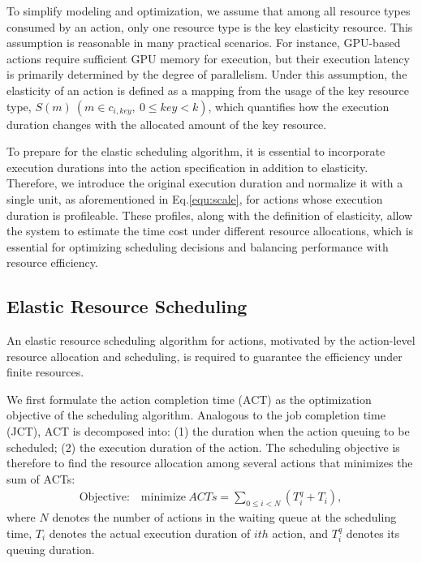 To simplify modeling and optimization, we assume that among all resource types consumed by an action, only one resource type is the key elasticity resource. 
This assumption is reasonable in many practical scenarios.
For instance, GPU-based actions require sufficient GPU memory for execution, but their execution latency is primarily determined by the degree of parallelism.
Under this assumption, the elasticity of an action is defined as a mapping from the usage of the key resource type, $S(m)~( m \in c_{i, key},~0\le key < k)$, which quantifies how the execution duration changes with the allocated amount of the key resource.

To prepare for the elastic scheduling algorithm, it is essential to incorporate execution durations into the action specification in addition to elasticity.
Therefore, we introduce the original execution duration and normalize it with a single unit, as aforementioned in Eq.\ref{equ:scale}, for actions whose execution duration is profileable. 
These profiles, along with the definition of elasticity, allow the system to estimate the time cost under different resource allocations, which is essential for optimizing scheduling decisions and balancing performance with resource efficiency. 


\subsection{Elastic Resource Scheduling}
\label{sec:design_scheduling}

An elastic resource scheduling algorithm for actions, motivated by the action-level resource allocation and scheduling, is required to guarantee the efficiency under finite resources. 

We first formulate the action completion time (ACT) as the optimization objective of the scheduling algorithm. 
Analogous to the job completion time (JCT), ACT is decomposed into: (1) the duration when the action queuing to be scheduled; (2) the execution duration of the action. The scheduling objective is therefore to find the resource allocation among several actions that minimizes the sum of ACTs:
\begin{equation}
\label{equ:obj}
\begin{aligned}
 \text{Objective:} \quad {\text{minimize}} ~ ACTs =\sum_{0\leq i < N} (T^q_{i} + T_i),
\end{aligned}
\end{equation}
where $N$ denotes the number of actions in the waiting queue at the scheduling time, $T_i$ denotes the actual execution duration of $ith$ action, and $T^q_{i}$ denotes its queuing duration.


